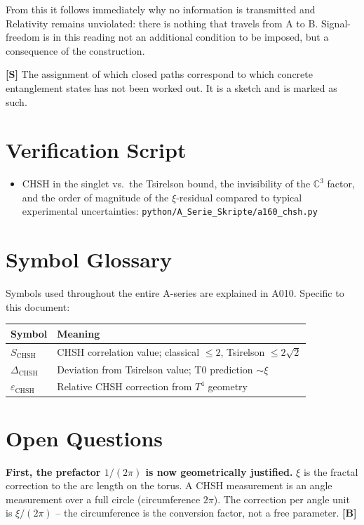 From this it follows immediately why no information is transmitted and Relativity
remains unviolated: there is nothing that travels from A to B. Signal-freedom is
in this reading not an additional condition to be imposed, but a consequence of
the construction.

\textbf{[S]} The assignment of which closed paths correspond to which concrete
entanglement states has not been worked out. It is a sketch and is marked as such.

\section{Verification Script}

\begin{itemize}
  \item CHSH in the singlet vs.\ the Tsirelson bound, the invisibility of the
    $\mathbb{C}^3$ factor, and the order of magnitude of the $\xi$-residual
    compared to typical experimental uncertainties:
    \texttt{python/A\_Serie\_Skripte/a160\_chsh.py}
\end{itemize}

\section{Symbol Glossary}

Symbols used throughout the entire A-series are explained in A010.
Specific to this document:

\begin{center}
\renewcommand{\arraystretch}{1.3}
{\small\begin{tabular}{lp{9cm}}
\toprule
Symbol & Meaning \\
\midrule
$S_\text{CHSH}$ & CHSH correlation value; classical $\leq2$, Tsirelson $\leq2\sqrt2$ \\
$\Delta_\text{CHSH}$ & Deviation from Tsirelson value; T0 prediction $\sim\xi$ \\
$\varepsilon_\text{CHSH}$ & Relative CHSH correction from $T^4$ geometry \\
\bottomrule
\end{tabular}}
\renewcommand{\arraystretch}{1.0}
\end{center}

\section{Open Questions}

\textbf{First, the prefactor $1/(2\pi)$ is now geometrically justified.}
$\xi$ is the fractal correction to the arc length on the torus. A CHSH measurement
is an angle measurement over a full circle (circumference $2\pi$). The correction
per angle unit is $\xi/(2\pi)$ -- the circumference is the conversion factor, not
a free parameter. \textbf{[B]}

